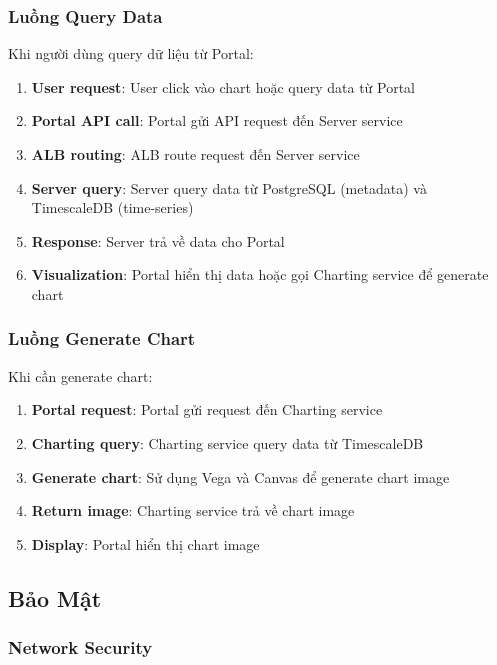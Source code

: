 \subsubsection{Luồng Query Data}

Khi người dùng query dữ liệu từ Portal:

\begin{enumerate}
    \item \textbf{User request}: User click vào chart hoặc query data từ Portal
    \item \textbf{Portal API call}: Portal gửi API request đến Server service
    \item \textbf{ALB routing}: ALB route request đến Server service
    \item \textbf{Server query}: Server query data từ PostgreSQL (metadata) và TimescaleDB (time-series)
    \item \textbf{Response}: Server trả về data cho Portal
    \item \textbf{Visualization}: Portal hiển thị data hoặc gọi Charting service để generate chart
\end{enumerate}

\subsubsection{Luồng Generate Chart}

Khi cần generate chart:

\begin{enumerate}
    \item \textbf{Portal request}: Portal gửi request đến Charting service
    \item \textbf{Charting query}: Charting service query data từ TimescaleDB
    \item \textbf{Generate chart}: Sử dụng Vega và Canvas để generate chart image
    \item \textbf{Return image}: Charting service trả về chart image
    \item \textbf{Display}: Portal hiển thị chart image
\end{enumerate}

\subsection{Bảo Mật}

\subsubsection{Network Security}


